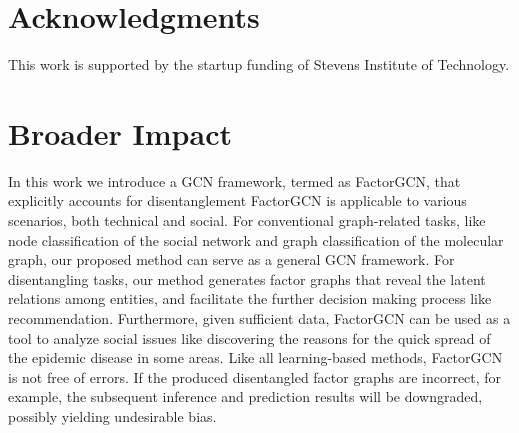 \documentclass{article}
\begin{document}
\section*{Acknowledgments}
This work is supported by the startup funding of 
Stevens Institute of Technology.

\section*{Broader Impact}
In this work we introduce a GCN framework,
termed as FactorGCN,
that explicitly accounts for disentanglement
FactorGCN is applicable to various scenarios, 
both technical and social. 
For conventional graph-related
tasks, like node classification of the social network
and graph classification of the molecular graph, 
our proposed method can serve as a general GCN
framework.
For disentangling tasks, our method
generates factor graphs that reveal
the latent relations among entities,
and facilitate the 
further decision making process like
recommendation.
Furthermore, given sufficient data,
FactorGCN can be used as a tool to 
analyze social issues like discovering 
the reasons for the quick spread of 
the epidemic disease in some areas. 
Like all learning-based methods,
FactorGCN is not free of errors.
If the produced disentangled factor graphs 
are incorrect, for example,
the subsequent inference and  prediction results
will be downgraded,  possibly yielding
undesirable bias. 

\newpage

\small


\end{document}
